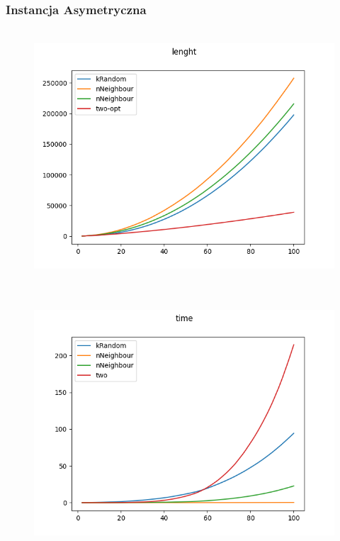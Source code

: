 \documentclass[11pt]{article}
\begin{document}
\subsubsection{Instancja Asymetryczna }
            \begin{center}
            \begin{figure}[H]

                \\ \includegraphics[scale=0.7]{images/lenght_sym.png}\

            \end{figure}
            \end{center}
            \begin{center}
            \begin{figure}[H]

                \\ \includegraphics[scale=0.7]{images/time_sym.png}\

            \end{figure}
            \end{center}
\end{document}
